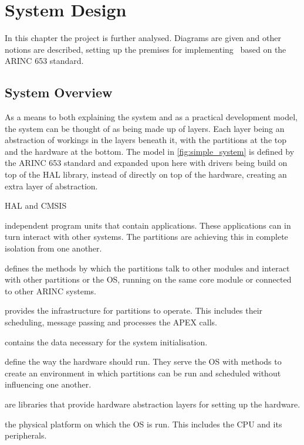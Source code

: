 \chapter{System Design}

In this chapter the project is further analysed. Diagrams are given
and other notions are described, setting up the premises for implementing
\OSname\ based on the ARINC 653 standard.

\section{System Overview}
As a means to both explaining the system and as a practical development
model, the system can be thought of as being made up of layers.
Each layer being an abstraction of workings in the layers beneath it,
with the partitions at the top and the hardware at the bottom.
The model in \ref{fig:simple_system} is defined by the ARINC 653 standard
and expanded upon here with drivers being build on top of the HAL library,
instead of directly on top of the hardware, creating an extra layer of
 abstraction.

\begin{labeling}{HAL and CMSIS}
	\item [\textbf{Partitions}]
		independent program units that contain applications. These
		applications can in turn interact with other systems. The
		partitions are achieving this in complete isolation from 
		one another.
	\item [\textbf{APEX}]
		defines the methods by which the partitions talk to other 
		modules and
		interact with other partitions or the OS, running
		on the same core module or connected to other ARINC systems.
	\item [\textbf{OS}]
		provides the infrastructure for partitions to operate. This 
		includes their scheduling, message passing and processes 
		the APEX calls.
	\item [\textbf{XML}]
		contains the data necessary for the system initialisation.
	\item [\textbf{Drivers}]
		define the way the hardware should run.	
		They serve the OS with methods to create an environment in which
		partitions can be run and scheduled without influencing one
		another.
	\item [\textbf{HAL and CMSIS}]
		are libraries that provide hardware abstraction layers for
		setting up the hardware. 
	\item [\textbf{Hardware}]
		the physical platform on which the OS is run. This 
		includes the CPU and its peripherals.
\end{labeling}

